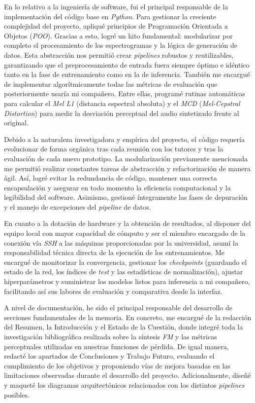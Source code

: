 En lo relativo a la ingeniería de software, fui el principal responsable de la implementación del código base en \textit{Python}. Para gestionar la creciente complejidad del proyecto, apliqué principios de Programación Orientada a Objetos (\textit{POO}). Gracias a esto, logré un hito fundamental: modularizar por completo el procesamiento de los espectrogramas y la lógica de generación de datos. Esta abstracción nos permitió crear \textit{pipelines} robustos y reutilizables, garantizando que el preprocesamiento de entrada fuera siempre óptimo e idéntico tanto en la fase de entrenamiento como en la de inferencia. También me encargué de implementar algorítmicamente todas las métricas de evaluación que posteriormente usaría mi compañero. Entre ellas, programé rutinas automáticas para calcular el \textit{Mel L1} (distancia espectral absoluta) y el \textit{MCD} (\textit{Mel-Cepstral Distortion}) para medir la desviación perceptual del audio sintetizado frente al original.

Debido a la naturaleza investigadora y empírica del proyecto, el código requería evolucionar de forma orgánica tras cada reunión con los tutores y tras la evaluación de cada nuevo prototipo. La modularización previamente mencionada me permitió realizar constantes tareas de abstracción y refactorización de manera ágil. Así, logré evitar la redundancia de código, mantener una correcta encapsulación y asegurar en todo momento la eficiencia computacional y la legibilidad del software. Asimismo, gestioné íntegramente las fases de depuración y el manejo de excepciones del \textit{pipeline} de datos.

En cuanto a la dotación de hardware y la obtención de resultados, al disponer del equipo local con mayor capacidad de cómputo y ser el miembro encargado de la conexión vía \textit{SSH} a las máquinas proporcionadas por la universidad, asumí la responsabilidad técnica directa de la ejecución de los entrenamientos. Me encargué de monitorizar la convergencia, gestionar los \textit{checkpoints} (guardando el estado de la red, los índices de \textit{test} y las estadísticas de normalización), ajustar hiperparámetros y suministrar los modelos listos para inferencia a mi compañero, facilitando así sus labores de evaluación y comparativa desde la interfaz.

A nivel de documentación, he sido el principal responsable del desarrollo de secciones fundamentales de la memoria. En concreto, me encargué de la redacción del Resumen, la Introducción y el Estado de la Cuestión, donde integré toda la investigación bibliográfica realizada sobre la síntesis \textit{FM} y las métricas perceptuales utilizadas en nuestras funciones de pérdida. De igual manera, redacté los apartados de Conclusiones y Trabajo Futuro, evaluando el cumplimiento de los objetivos y proponiendo vías de mejora basadas en las limitaciones observadas durante el desarrollo del proyecto. Adicionalmente, diseñé y maqueté los diagramas arquitectónicos relacionados con los distintos \textit{pipelines} posibles.


